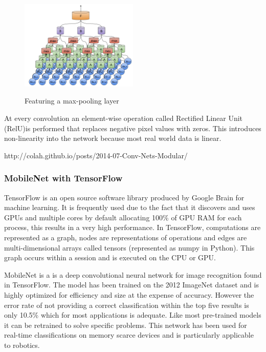 \documentclass{mproj}
\begin{document}
\begin{figure}[h]
  \caption{Featuring a max-pooling layer}
  \centering
  \includegraphics[width=0.5\textwidth]{images/conv_max.png}
  \label{fig:Basic CNN with Max-pooling diagram}
\end{figure}

At every convolution an element-wise operation called Rectified Linear Unit (RelU)is performed that replaces negative pixel values with zeros. This introduces non-linearity into the network because most real world data is linear.

http://colah.github.io/posts/2014-07-Conv-Nets-Modular/

\subsubsection{MobileNet with TensorFlow}
TensorFlow is an open source software library produced by Google Brain for machine learning. It is frequently used due to the fact that it discovers and uses GPUs and multiple cores by default allocating 100\% of GPU RAM for each process, this results in a very high performance. In TensorFlow, computations are represented as a graph, nodes are representations of operations and edges are multi-dimensional arrays called tensors (represented as numpy in Python). This graph occurs within a session and is executed on the CPU or GPU. 
  
MobileNet is a is a deep convolutional neural network for image recognition found in TensorFlow\cite{HowardZCKWWAA17}. The model has been trained on the 2012 ImageNet dataset and is highly optimized for efficiency and size at the expense of accuracy. However the error rate of not providing a correct classification within the top five results is only 10.5\% which for most applications is adequate. Like most pre-trained models it can be retrained to solve specific problems. This network has been used for real-time classifications on memory scarce devices and is particularly applicable to robotics.
  
\end{document}
